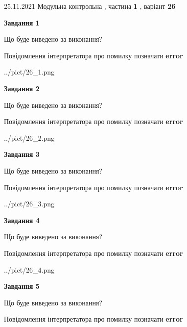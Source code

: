 \documentclass[10pt, ukrainian]{article}
\begin{document}
{25.11.2021 Модульна контрольна , частина \textbf { 1 }, варіант  \No \textbf { 26 }\par}
{
\begin {large}

{\begin {center}\textbf{Завдання 1}\end {center}}\par
Що буде виведено за виконання? \par
Повідомлення інтерпретатора про помилку позначати \textbf{error}

\begin{center}
	{../pict/26_1.png}
\end{center}
\newpage

{\begin {center}\textbf{Завдання 2}\end {center}}\par
Що буде виведено за виконання? \par
Повідомлення інтерпретатора про помилку позначати \textbf{error}

\begin{center}
	{../pict/26_2.png}
\end{center}
\newpage

{\begin {center}\textbf{Завдання 3}\end {center}}\par
Що буде виведено за виконання? \par
Повідомлення інтерпретатора про помилку позначати \textbf{error}

\begin{center}
	{../pict/26_3.png}
\end{center}
\newpage

{\begin {center}\textbf{Завдання 4}\end {center}}\par
Що буде виведено за виконання? \par
Повідомлення інтерпретатора про помилку позначати \textbf{error}

\begin{center}
	{../pict/26_4.png}
\end{center}
\newpage

{\begin {center}\textbf{Завдання 5}\end {center}}\par
Що буде виведено за виконання? \par
Повідомлення інтерпретатора про помилку позначати \textbf{error}


\end{large}}
\end{document}
